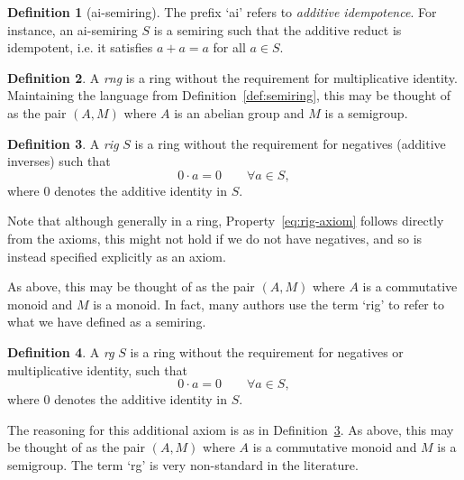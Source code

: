 \documentclass{article}
\theoremstyle{definition}
\newtheorem{defn}{Definition}[section]
\theoremstyle{plain}
\begin{document}


\begin{defn}[ai-semiring]
  The prefix `ai' refers to \emph{additive idempotence}. For
  instance, an ai-semiring \(S\) is a semiring such that the additive
  reduct is idempotent, i.e. it satisfies \(a + a = a\) for all \(a\in S\).
\end{defn}

\begin{defn}
  A \emph{rng} is a ring without the requirement for multiplicative
  identity. Maintaining the language from
  Definition~\ref{def:semiring}, this may be thought of as the pair
  \((A, M)\) where \(A\) is an abelian group and \(M\) is a semigroup.
\end{defn}

\begin{defn}
  \label{def:rig}
  A \emph{rig} \(S\) is a ring without the requirement for negatives
  (additive inverses) such that
  \begin{equation}
    \label{eq:rig-axiom}
    0\cdot a=0\qquad\forall a\in S,
  \end{equation}
  where \(0\) denotes the additive identity in \(S\).

  Note that although generally in a ring,
  Property~\eqref{eq:rig-axiom} follows directly from the axioms,
  this might not hold if we do not have negatives, and so is instead
  specified explicitly as an axiom.

  As above, this may be thought of as the pair \((A, M)\) where \(A\)
  is a commutative monoid and \(M\) is a monoid. In fact, many
  authors use the term `rig' to refer to what we have defined as a semiring.

\end{defn}
\begin{defn}
  A \emph{rg} \(S\) is a ring without the requirement for negatives
  or multiplicative identity, such that
  \begin{equation*}
    0\cdot a=0\qquad\forall a\in S,
  \end{equation*}
  where \(0\) denotes the additive identity in \(S\).

  The reasoning for this additional axiom is as in
  Definition~\ref{def:rig}. As above, this may be thought of as the
  pair \((A, M)\) where \(A\) is a commutative monoid and \(M\) is a
  semigroup. The term `rg' is very non-standard in the literature.
\end{defn}
\end{document}
